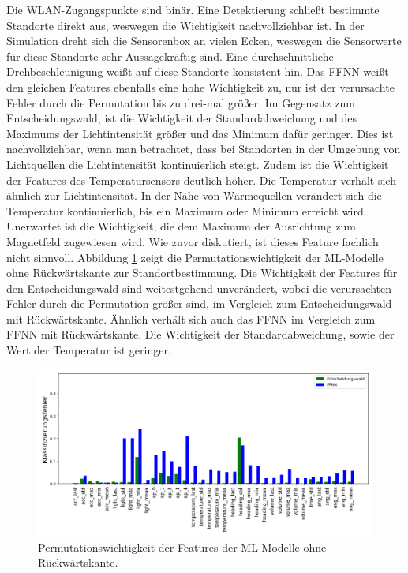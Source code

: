 Die WLAN-Zugangspunkte sind binär.
Eine Detektierung schließt bestimmte Standorte direkt aus, weswegen die Wichtigkeit nachvollziehbar ist.
In der Simulation dreht sich die Sensorenbox an vielen Ecken, weswegen die Sensorwerte für diese Standorte sehr Aussagekräftig sind.
Eine durchschnittliche Drehbeschleunigung weißt auf diese Standorte konsistent hin.
\newline
\newline
Das FFNN weißt den gleichen Features ebenfalls eine hohe Wichtigkeit zu, nur ist der verursachte Fehler durch die Permutation bis zu drei-mal größer.
Im Gegensatz zum Entscheidungswald, ist die Wichtigkeit der Standardabweichung und des Maximums der Lichtintensität größer und das Minimum dafür geringer.
Dies ist nachvollziehbar, wenn man betrachtet, dass bei Standorten in der Umgebung von Lichtquellen die Lichtintensität kontinuierlich steigt.
Zudem ist die Wichtigkeit der Features des Temperatursensors deutlich höher.
Die Temperatur verhält sich ähnlich zur Lichtintensität.
In der Nähe von Wärmequellen verändert sich die Temperatur kontinuierlich, bis ein Maximum oder Minimum erreicht wird.
Unerwartet ist die Wichtigkeit, die dem Maximum der Ausrichtung zum Magnetfeld zugewiesen wird.
Wie zuvor diskutiert, ist dieses Feature fachlich nicht sinnvoll.
\newline
\newline
Abbildung \ref{fig:fi_consolidated_wo_fb} zeigt die Permutationswichtigkeit der ML-Modelle ohne Rückwärtskante zur Standortbestimmung.
Die Wichtigkeit der Features für den Entscheidungswald sind weitestgehend unverändert,
wobei die verursachten Fehler durch die Permutation größer sind, im Vergleich zum Entscheidungswald mit Rückwärtskante.
Ähnlich verhält sich auch das FFNN im Vergleich zum FFNN mit Rückwärtskante.
Die Wichtigkeit der Standardabweichung, sowie der Wert der Temperatur ist geringer.
\begin{figure}[h!]
    \centering
    \includegraphics[width=\linewidth]{images/fi_consolidated_wo_fb.png}
    \caption{Permutationswichtigkeit der Features der ML-Modelle ohne Rückwärtskante.}
    \label{fig:fi_consolidated_wo_fb}
\end{figure}
